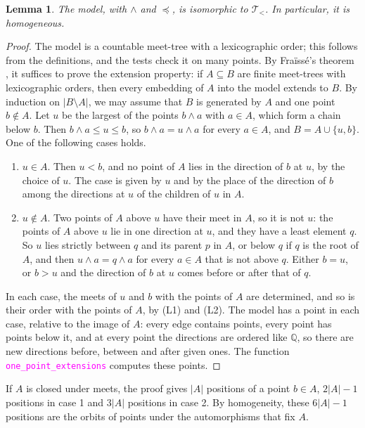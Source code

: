 \documentclass[12pt,a4paper,article]{memoir}
\newcommand{\Q}{\mathbb{Q}}
\newcommand{\code}[1]{\texttt{\textcolor{magenta}{#1}}}
\newtheorem{lemma}[theorem]{Lemma}
\theoremstyle{definition}
\begin{document}
\begin{lemma}\label{lem:tree model}
The model, with $\wedge$ and $\preceq$, is isomorphic to $\mathcal{T}_<$. In particular, it is homogeneous.
\end{lemma}
\begin{proof}
The model is a countable meet-tree with a lexicographic order;
this follows from the definitions, and the tests check it on many points.
By Fra\"{i}ss\'{e}'s theorem \cite[Section 7.1]{Hod93},
it suffices to prove the extension property:
if $A \subseteq B$ are finite meet-trees with lexicographic orders,
then every embedding of $A$ into the model extends to $B$.
By induction on $|B \setminus A|$, we may assume that $B$ is generated by $A$ and one point $b \notin A$.
Let $u$ be the largest of the points $b \wedge a$ with $a \in A$, which form a chain below $b$.
Then $b \wedge a \le u \le b$, so $b \wedge a = u \wedge a$ for every $a \in A$, and $B = A \cup \{u, b\}$.
One of the following cases holds.
\begin{enumerate}
\item $u \in A$. Then $u < b$, and no point of $A$ lies in the direction of $b$ at $u$, by the choice of $u$.
The case is given by $u$ and by the place of the direction of $b$
among the directions at $u$ of the children of $u$ in $A$.
\item $u \notin A$. Two points of $A$ above $u$ have their meet in $A$, so it is not $u$:
the points of $A$ above $u$ lie in one direction at $u$, and they have a least element $q$.
So $u$ lies strictly between $q$ and its parent $p$ in $A$, or below $q$ if $q$ is the root of $A$,
and then $u \wedge a = q \wedge a$ for every $a \in A$ that is not above $q$.
Either $b = u$, or $b > u$ and the direction of $b$ at $u$ comes before or after that of $q$.
\end{enumerate}
In each case, the meets of $u$ and $b$ with the points of $A$ are determined,
and so is their order with the points of $A$, by (L1) and (L2).
The model has a point in each case, relative to the image of $A$:
every edge contains points, every point has points below it,
and at every point the directions are ordered like $\Q$,
so there are new directions before, between and after given ones.
The function \code{one\_point\_extensions} computes these points.
\end{proof}

If $A$ is closed under meets, the proof gives $|A|$ positions of a point $b \in A$,
$2|A| - 1$ positions in case 1 and $3|A|$ positions in case 2.
By homogeneity, these $6|A| - 1$ positions are the orbits of points
under the automorphisms that fix $A$.
\end{document}
